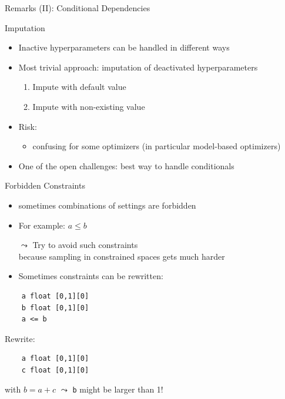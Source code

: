 \begin{frame}[c, fragile]{Remarks (II): Conditional Dependencies}

\begin{block}{Imputation}
	\begin{itemize}
		\item Inactive hyperparameters can be handled in different ways
		\item Most trivial approach: imputation of deactivated hyperparameters
		\begin{enumerate}
			\item Impute with default value
			\item Impute with non-existing value
		\end{enumerate}
		\pause
		\medskip
		\item Risk:
		\begin{itemize}
			\item confusing for some optimizers (in particular model-based optimizers)
		\end{itemize}
		\pause
		\item One of the open challenges: best way to handle conditionals
	\end{itemize}
\end{block}

\end{frame}
\begin{frame}[c, fragile]{Forbidden Constraints}

\begin{itemize}
  \item sometimes combinations of settings are forbidden
  \item For example: $a \leq b$
  \smallskip
  \pause
  \item[$\leadsto$] Try to avoid such constraints\\ because sampling in constrained spaces gets much harder
  \smallskip
  \item Sometimes constraints can be rewritten:
\end{itemize}

\begin{verbatim}
    a float [0,1][0]
    b float [0,1][0]
    a <= b
\end{verbatim}

Rewrite:
\begin{verbatim}
    a float [0,1][0]
    c float [0,1][0]
\end{verbatim}

with $b = a + c$ $\leadsto$ \texttt{b} might be larger than 1! 


\end{frame}
